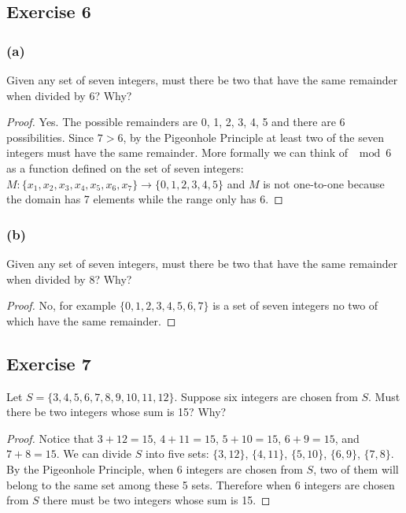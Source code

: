 \documentclass[14pt]{extarticle}
\begin{document}
\subsection{Exercise 6}
\subsubsection{(a)}
Given any set of seven integers, must there be two that have the same remainder when divided by 6? Why?

\begin{proof}
     Yes. The possible remainders are 0, 1, 2, 3, 4, 5 and there are 6 possibilities. Since \(7 > 6\), by the Pigeonhole
     Principle at least two of the seven integers must have the same remainder. More formally we can think of \(\mod 6\) as
     a function defined on the set of seven integers: \(M: \{x_1 ,x_2,x_3,x_4 , x_5 , x_6 , x_7\} \to \{0, 1, 2, 3, 4, 5\}\)
     and \(M\) is not one-to-one because the domain has 7 elements while the range only has 6.
\end{proof}

\subsubsection{(b)}
Given any set of seven integers, must there be two that have the same remainder when divided by 8? Why?

\begin{proof}
     No, for example \(\{0, 1, 2, 3, 4, 5, 6, 7\}\) is a set of seven integers no two of which have the same remainder.
\end{proof}

\subsection{Exercise 7}
Let \(S = \{3, 4, 5, 6, 7, 8, 9, 10, 11, 12\}\). Suppose six integers are chosen from \(S\). Must there be two
integers whose sum is 15? Why?

\begin{proof}
     Notice that \(3 + 12 = 15\), \(4 + 11 = 15\), \(5 + 10 = 15\), \(6 + 9 = 15\), and \(7 + 8 = 15\). We can divide \(S\) into
     five sets: \(\{3, 12\}\), \(\{4, 11\}\), \(\{5, 10\}\), \(\{6, 9\}\), \(\{7, 8\}\). By the Pigeonhole Principle, when 6
     integers are chosen from \(S\), two of them will belong to the same set among these 5 sets. Therefore when 6 integers are
     chosen from \(S\) there must be two integers whose sum is 15.
\end{proof}
\end{document}
